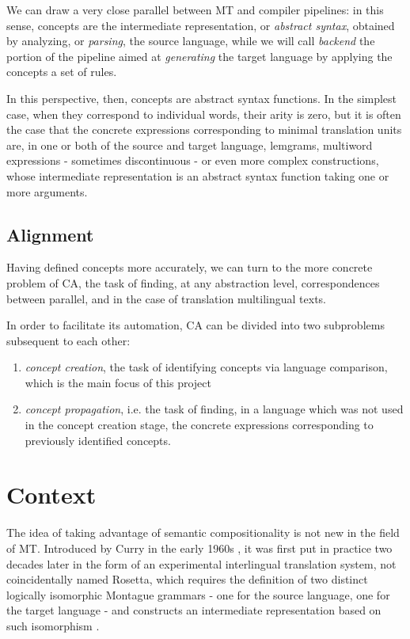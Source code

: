 \documentclass{article}
\begin{document}
We can draw a very close parallel between MT and compiler pipelines: in this sense, concepts are the intermediate representation, or \textit{abstract syntax}, obtained by analyzing, or \textit{parsing}, the source language, while we will call \textit{backend} the portion of the pipeline aimed at \textit{generating} the target language by applying the concepts a set of rules.

In this perspective, then, concepts are abstract syntax functions. In the simplest case, when they correspond to individual words, their arity is zero, but it is often the case that the concrete expressions corresponding to minimal translation units are, in one or both of the source and target language, lemgrams, multiword expressions - sometimes discontinuous - or even more complex constructions, whose intermediate representation is an abstract syntax function taking one or more arguments.

\subsection{Alignment}
Having defined concepts more accurately, we can turn to the more concrete problem of CA, the task of finding, at any abstraction level, correspondences between parallel, and in the case of translation multilingual texts.

In order to facilitate its automation, CA can be divided into two subproblems subsequent to each other:
\begin{enumerate}
    \item \textit{concept creation}, the task of identifying concepts via language comparison, which is the main focus of this project
    \item \textit{concept propagation}, i.e. the task of finding, in a language which was not used in the concept creation stage, the concrete expressions corresponding to previously identified concepts.
\end{enumerate}


\section{Context}
The idea of taking advantage of semantic compositionality is not new in the field of MT. Introduced by Curry in the early 1960s \cite{curry61}, %
it was first put in practice two decades later in the form of an experimental interlingual translation system, not coincidentally named Rosetta, which requires the definition of two distinct logically isomorphic Montague grammars - one for the source language, one for the target language - and constructs an intermediate representation based on such isomorphism \cite{rosetta}. 
\end{document}
